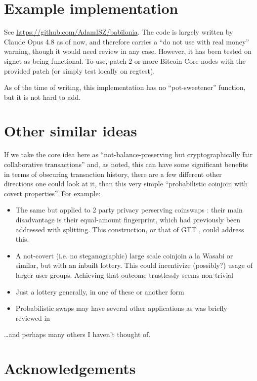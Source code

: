 \documentclass[11pt]{article}
\begin{document}
\section{Example implementation}

See \url{https://github.com/AdamISZ/babilonia}. The code is largely written by Claude Opus 4.8 as of now, and therefore carries a ``do not use with real money'' warning, though it would need review in any case. However, it has been tested on signet as being functional. To use, patch 2 or more Bitcoin Core nodes with the provided patch (or simply test locally on regtest).

As of the time of writing, this implementation has no ``pot-sweetener'' function, but it is not hard to add.

\section{Other similar ideas}
\label{sec:ideas}

If we take the core idea here as ``not-balance-preserving but cryptographically fair collaborative transactions'' and, as noted, this can have some significant benefits in terms of obscuring transaction history, there are a few different other directions one could look at it, than this very simple ``probabilistic coinjoin with covert properties''. For example:

\begin{itemize}
\item The same but applied to 2 party privacy perserving coinswaps \cite{coinswap}: their main disadvantage is their equal-amount fingerprint, which had previously been addressed with splitting. This construction, or that of GTT \cite{gerhardt2026}, could address this.
\item A not-covert (i.e. no steganographic) large scale coinjoin a la Wasabi or similar, but with an inbuilt lottery. This could incentivize (possibly?) usage of larger user groups. Achieving that outcome trustlessly seems non-trivial
\item Just a lottery generally, in one of these or another form
\item Probabilistic swaps may have several other applications as was briefly reviewed in \cite{gerhardt2026}
\end{itemize}

\ldots and perhaps many others I haven't thought of.

\section{Acknowledgements}
\end{document}
